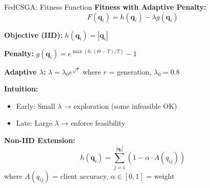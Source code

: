 \documentclass{beamer}
\begin{document}
\begin{frame}{FedCSGA: Fitness Function}
\textbf{Fitness with Adaptive Penalty:}
\begin{equation}
F(\mathbf{q}_i) = h(\mathbf{q}_i) - \lambda g(\mathbf{q}_i)
\end{equation}

\textbf{Objective (IID):} $h(\mathbf{q}_i) = |\mathbf{q}_i|$

\textbf{Penalty:} $g(\mathbf{q}_i) = e^{\max(0, (\Theta - T)/T)} - 1$

\textbf{Adaptive $\lambda$:} $\lambda = \lambda_0 e^{\sqrt{r}}$ where $r$ = generation, $\lambda_0=0.8$

\textbf{Intuition:}
\begin{itemize}
\item Early: Small $\lambda$ → exploration (some infeasible OK)
\item Late: Large $\lambda$ → enforce feasibility
\end{itemize}

\textbf{Non-IID Extension:}
\begin{equation}
h(\mathbf{q}_i) = \sum_{j=1}^{|\mathbf{q}_i|} (1 - \alpha \cdot A(q_{ij}))
\end{equation}
where $A(q_{ij})$ = client accuracy, $\alpha \in [0,1]$ = weight
\end{frame}
\end{document}
